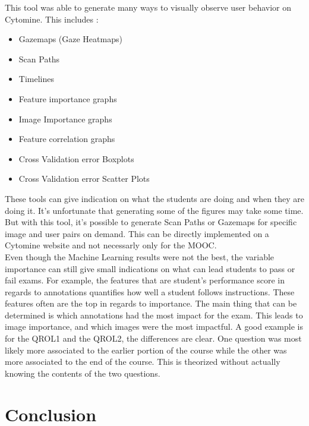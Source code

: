 \documentclass[a4paper,11pt]{report}
\numberwithin{figure}{section} %
\begin{document}
        This tool was able to generate many ways to visually observe user behavior on Cytomine. This includes :
        \begin{itemize}
            \item[\textbullet] Gazemaps (Gaze Heatmaps)
            \item[\textbullet] Scan Paths
            \item[\textbullet] Timelines
            \item[\textbullet] Feature importance graphs
            \item[\textbullet] Image Importance graphs
            \item[\textbullet] Feature correlation graphs
            \item[\textbullet] Cross Validation error Boxplots
            \item[\textbullet] Cross Validation error Scatter Plots
        \end{itemize}

        These tools can give indication on what the students are doing and when they are doing it.
        It's unfortunate that generating some of the figures may take some time.
        But with this tool, it's possible to generate Scan Paths or Gazemaps for specific image and user pairs on demand.
        This can be directly implemented on a Cytomine website and not necessarly only for the MOOC.\\


        Even though the Machine Learning results were not the best, the variable importance can still give small indications on what can lead students to pass or fail exams.
        For example, the features that are student's performance score in regards to annotations quantifies how well a student follows instructions.
        These features often are the top in regards to importance.
        The main thing that can be determined is which annotations had the most impact for the exam.
        This leads to image importance, and which images were the most impactful.
        A good example is for the QROL1 and the QROL2, the differences are clear.
        One question was most likely more associated to the earlier portion of the course while the other was more associated to the end of the course.
        This is theorized without actually knowing the contents of the two questions.



\chapter{Conclusion}
\end{document}
